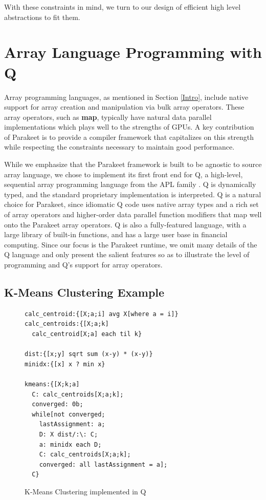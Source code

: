 \documentclass[preprint]{sigplanconf}
\begin{document}
With these constraints in mind, we turn to our design of efficient high level
abstractions to fit them.

\section{Array Language Programming with Q}
\label{Q}
Array programming languages, as mentioned in Section \ref{Intro}, include
native support for array creation and manipulation via bulk array operators.
These array operators, such as \textbf{map}, typically have natural data
parallel implementations which plays well to the strengths of GPUs.  A key
contribution of Parakeet is to provide a compiler framework that capitalizes on
this strength while respecting the constraints necessary to maintain good
performance.

While we emphasize that the Parakeet framework is built to be agnostic to source
array language, we chose to implement its first front end for Q, a high-level,
sequential array programming language from the APL family \cite{Borr08}.
Q is dynamically typed, and the standard proprietary implementation is
interpreted. Q is a natural choice for Parakeet, since idiomatic Q code uses
native array types and a rich set of array operators and higher-order
data parallel function modifiers that map well onto the Parakeet array
operators. Q is also a fully-featured language, with a large library of built-in
functions, and has a large user base in financial computing. Since our
focus is the Parakeet runtime, we omit many details of the Q language and only
present the salient features so as to illustrate the level of programming
and Q's support for array operators.

\subsection{K-Means Clustering Example}
\begin{figure}[h!]
\begin{lstlisting}
calc_centroid:{[X;a;i] avg X[where a = i]}
calc_centroids:{[X;a;k]
  calc_centroid[X;a] each til k}

dist:{[x;y] sqrt sum (x-y) * (x-y)}
minidx:{[x] x ? min x}

kmeans:{[X;k;a]
  C: calc_centroids[X;a;k];
  converged: 0b;
  while[not converged;
    lastAssignment: a;
    D: X dist/:\: C;
    a: minidx each D;
    C: calc_centroids[X;a;k];
    converged: all lastAssignment = a];
  C}
\end{lstlisting}
\caption{K-Means Clustering implemented in Q}
\label{QKMeans}
\end{figure}
\end{document}
